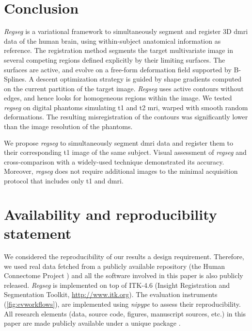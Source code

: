 \section*{Conclusion}
\label{sec:conclusion}

\emph{Regseg} is a variational framework to simultaneously segment and
  register 3D \gls*{dmri} data of the human brain, using within-subject
  anatomical information as reference.
The registration method segments the target multivariate image in several competing regions
  defined explicitly by their limiting surfaces.
The surfaces are active, and evolve on a free-form deformation field supported by B-Splines.
A descent optimization strategy is guided by shape gradients computed on the current partition
  of the target image.
\emph{Regseg} uses active contours without edges, and hence looks for
  homogeneous regions within the image.
We tested \emph{regseg} on digital phantoms simulating \gls*{t1} and \gls*{t2} \gls*{mri},
	warped with smooth random deformations.
The resulting misregistration of the contours was significantly lower than the image resolution
  of the phantoms.

We propose \emph{regseg} to simultaneously segment \gls*{dmri} data and register them to
  their corresponding \gls*{t1} image of the same subject.
Visual assessment of \emph{regseg} and cross-comparison with a widely-used technique demonstrated 
  its accuracy.
Moreover, \emph{regseg} does not require additional images to the minimal acquisition protocol
  that includes only \gls*{t1} and \gls*{dmri}.

\section*{Availability and reproducibility statement}
\label{sec:availability}
We considered the reproducibility of our results a design requirement.
Therefore, we used real data fetched from a publicly available repository
  (the Human Connectome Project \citep{essen_human_2012}) and all the software
  involved in this paper is also publicly released.
\emph{Regseg} is implemented on top of ITK-4.6 (Insight Registration and 
  Segmentation Toolkit, \url{http://www.itk.org}).
The evaluation instruments (\autoref{fig:evworkflows}), are implemented using
  \emph{nipype} \citep{gorgolewski_nipype_2011} to assess their reproducibility.
All research elements (data, source code, figures, manuscript sources, etc.) in this paper
  are made publicly available under a unique package \citep{esteban_acweregistration_2015}.